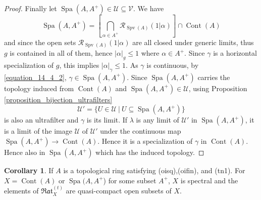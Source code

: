 \documentclass[10pt]{article}
\numberwithin{equation}{section}
\theoremstyle{definition}
\newtheorem{corollary}{Corollary} [subsection]
\DeclareMathOperator{\Spa}{Spa}
\DeclareMathOperator{\Spv}{Spv}
\DeclareMathOperator{\Cont}{Cont}
\newcommand{\U}[0]{\mathcal{U}}
\newcommand{\cR}[0]{\mathcal{R}}
\newcommand{\sep}[0]{\:|\:}
\newcommand{\ab}[1]{\vert #1 \vert}
\newcommand{\cV}[0]{\mathcal{V}}
\newcommand{\Rat}[0]{\mathfrak{Rat}}
\begin{document}
\begin{proof}
    \par Finally let $\Spa(A,A^+)\in\U\subseteq\cV$. We have
    \begin{equation}
        \Spa(A,A^+)=\left[\bigcap_{\alpha\in A^+}\cR_{\Spv(A)}(1|\alpha)\right]\cap\Cont(A)
        \label{equation_14_4_2}
    \end{equation}
    and since the open sets $\cR_{\Spv(A)}(1|\alpha)$ are all closed under generic limits, thus $g$ is contained in all of them, hence $\ab{\alpha}_g\leq1$ where $\alpha\in A^+$. Since $\gamma$ is a horizontal specialization of $g$, this implies $\ab{\alpha}_\gamma\leq1$. As $\gamma$ is continuous, by \eqref{equation_14_4_2}, $\gamma\in\Spa(A,A^+)$.
    Since $\Spa(A,A^+)$ carries the topology induced from $\Cont(A)$ and $\Spa(A,A^+)\in\U$, using Proposition \ref{proposition_bijection_ultrafilters}
    \begin{equation*}
        \U' =\{U\in\U\sep U\subseteq \Spa(A,A^+)\}
    \end{equation*}
    is also an ultrafilter and $\gamma$ is its limit.
    If $\lambda$ is any limit of $\U'$ in $\Spa(A,A^+)$, it is a limit of the image $\U$ of $\U'$ under the continuous map $\Spa(A,A^+)\to \Cont(A)$. Hence it is a specialization of $\gamma$ in $\Cont(A)$. Hence also in $\Spa(A,A^+)$ which has the induced topology.
\end{proof}
\begin{corollary}
    \label{corollary_14_2}
    If $A$ is a topological ring satisfying (oisq),(oifin), and (tn1). For $X=\Cont(A)$ or $\Spa(A,A^+$) for some subset $A^+$, $X$ is spectral and the elements of $\Rat_X^{(t)}$ are quasi-compact open subsets of $X$.
\end{corollary}
\end{document}
